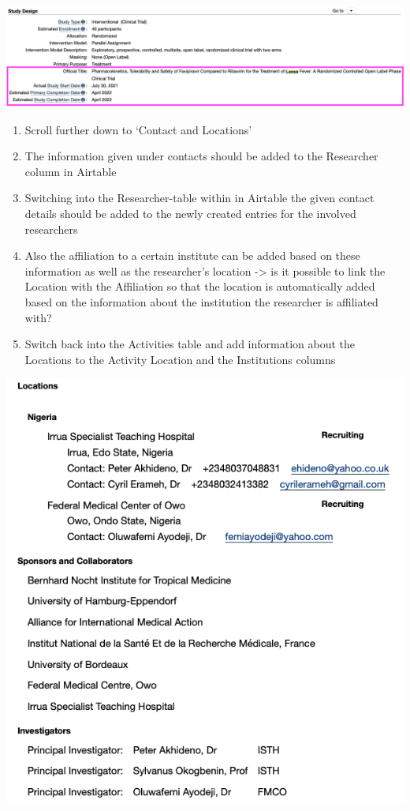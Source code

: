 \documentclass[
]{book}
\begin{document}
\includegraphics{images/clinicaltrial5.png}

\begin{enumerate}
\def\labelenumi{\arabic{enumi}.}
\setcounter{enumi}{9}
\item
  Scroll further down to `Contact and Locations'
\item
  The information given under contacts should be added to the Researcher column in Airtable
\item
  Switching into the Researcher-table within in Airtable the given contact details should be added to the newly created entries for the involved researchers
\item
  Also the affiliation to a certain institute can be added based on these information as well as the researcher's location -\textgreater{} is it possible to link the Location with the Affiliation so that the location is automatically added based on the information about the institution the researcher is affiliated with?
\item
  Switch back into the Activities table and add information about the Locations to the Activity Location and the Institutions columns
\end{enumerate}

\includegraphics{images/clinicaltrial6.png}
\end{document}
